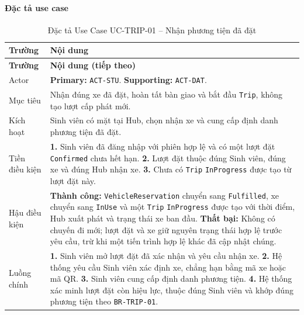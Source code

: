 \paragraph{Đặc tả use case}
\small
\begin{longtable}{|L{26mm}|L{118mm}|}
  \caption{Đặc tả Use Case UC-TRIP-01 -- Nhận phương tiện đã đặt}\label{tab:spec-UC-TRIP-01}\\
  \hline
  \centering\arraybackslash\textbf{Trường} & \centering\arraybackslash\textbf{Nội dung}\\
  \hline
  \endfirsthead
  \hline
  \centering\arraybackslash\textbf{Trường} & \centering\arraybackslash\textbf{Nội dung (tiếp theo)}\\
  \hline
  \endhead
  Actor & \textbf{Primary:} \texttt{ACT-STU}. \textbf{Supporting:} \texttt{ACT-DAT}.\\\hline
  Mục tiêu & Nhận đúng xe đã đặt, hoàn tất bàn giao và bắt đầu \texttt{Trip}, không tạo lượt cấp phát mới.\\\hline
  Kích hoạt & Sinh viên có mặt tại Hub, chọn nhận xe và cung cấp định danh phương tiện đã đặt.\\\hline
  Tiền điều kiện &
    \textbf{1.} Sinh viên đã đăng nhập với phiên hợp lệ và có một lượt đặt \texttt{Confirmed} chưa hết hạn.\newline
    \textbf{2.} Lượt đặt thuộc đúng Sinh viên, đúng xe và đúng Hub nhận xe.\newline
    \textbf{3.} Chưa có \texttt{Trip} \texttt{InProgress} được tạo từ lượt đặt này.\\\hline
  Hậu điều kiện &
    \textbf{Thành công:} \texttt{VehicleReservation} chuyển sang \texttt{Fulfilled}, xe chuyển sang \texttt{InUse} và một \texttt{Trip} \texttt{InProgress} được tạo với thời điểm, Hub xuất phát và trạng thái xe ban đầu.\newline
    \textbf{Thất bại:} Không có chuyến đi mới; lượt đặt và xe giữ nguyên trạng thái hợp lệ trước yêu cầu, trừ khi một tiến trình hợp lệ khác đã cập nhật chúng.\\\hline
  Luồng chính &
    \textbf{1.} Sinh viên mở lượt đặt đã xác nhận và yêu cầu nhận xe.\newline
    \textbf{2.} Hệ thống yêu cầu Sinh viên xác định xe, chẳng hạn bằng mã xe hoặc mã QR.\newline
    \textbf{3.} Sinh viên cung cấp định danh phương tiện.\newline
    \textbf{4.} Hệ thống xác minh lượt đặt còn hiệu lực, thuộc đúng Sinh viên và khớp đúng phương tiện theo \texttt{BR-TRIP-01}.\newline

\end{longtable}
